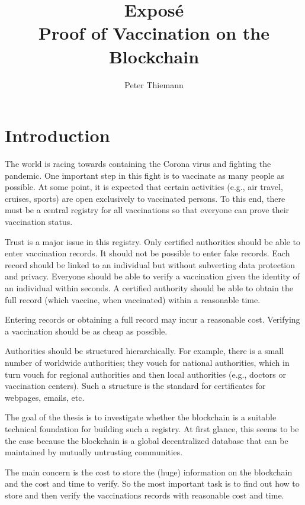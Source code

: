\documentclass{article}
\title{Expos\'{e}\\
  Proof of Vaccination on the Blockchain}
\author{Peter Thiemann}
\begin{document}
\maketitle

\section{Introduction}
\label{sec:introduction}

The world is racing towards containing the Corona virus and fighting the pandemic.
One important step in this fight is to vaccinate as many people as possible.
At some point, it is expected that certain activities (e.g., air travel, cruises, sports) are open
exclusively to vaccinated  persons. To this end, there must be a central registry for all
vaccinations so that everyone can prove their vaccination status.

Trust is a major issue in this registry. Only certified authorities should be able to enter
vaccination records. It should not be possible to enter fake records. Each record should be linked
to an individual but without subverting data protection and privacy. Everyone
should be able to verify a vaccination given the identity of an individual within seconds.
A certified authority should be able to obtain the full record (which vaccine, when vaccinated)
within a reasonable time.

Entering records or obtaining a full record may incur a reasonable cost. Verifying a vaccination
should be as cheap as possible.

Authorities should be structured hierarchically. For example, there is a small number of worldwide
authorities; they vouch for national authorities, which in turn vouch for regional authorities and
then local authorities (e.g., doctors or vaccination centers). Such a structure is the standard for
certificates for webpages, emails, etc.

The goal of the thesis is to investigate whether the blockchain is a suitable technical foundation
for building such a registry. At first glance, this seems to be the case because the blockchain is a
global decentralized database that can be maintained by mutually untrusting communities.

The main concern is the cost to store the (huge) information on the blockchain and the cost and time
to verify.  So the most important task is to find out how to store and then verify the
vaccinations records with reasonable cost and time.
\end{document}
